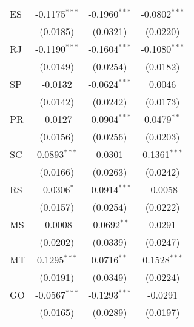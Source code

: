 \begin{tabular}{lccc}
   ES                              & -0.1175$^{***}$         & -0.1960$^{***}$         & -0.0802$^{***}$\\   
                                   & (0.0185)                & (0.0321)                & (0.0220)\\   
   RJ                              & -0.1190$^{***}$         & -0.1604$^{***}$         & -0.1080$^{***}$\\   
                                   & (0.0149)                & (0.0254)                & (0.0182)\\   
   SP                              & -0.0132                 & -0.0624$^{***}$         & 0.0046\\   
                                   & (0.0142)                & (0.0242)                & (0.0173)\\   
   PR                              & -0.0127                 & -0.0904$^{***}$         & 0.0479$^{**}$\\   
                                   & (0.0156)                & (0.0256)                & (0.0203)\\   
   SC                              & 0.0893$^{***}$          & 0.0301                  & 0.1361$^{***}$\\   
                                   & (0.0166)                & (0.0263)                & (0.0242)\\   
   RS                              & -0.0306$^{*}$           & -0.0914$^{***}$         & -0.0058\\   
                                   & (0.0157)                & (0.0254)                & (0.0222)\\   
   MS                              & -0.0008                 & -0.0692$^{**}$          & 0.0291\\   
                                   & (0.0202)                & (0.0339)                & (0.0247)\\   
   MT                              & 0.1295$^{***}$          & 0.0716$^{**}$           & 0.1528$^{***}$\\   
                                   & (0.0191)                & (0.0349)                & (0.0224)\\   
   GO                              & -0.0567$^{***}$         & -0.1293$^{***}$         & -0.0291\\   
                                   & (0.0165)                & (0.0289)                & (0.0197)\\   
   \midrule

\end{tabular}
